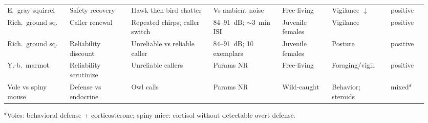 \begin{landscape}
\begin{longtable}{@{}p{0.95in}p{0.8in}p{1.25in}p{1.15in}p{0.85in}p{0.85in}p{0.55in}p{0.7in}@{}}
E.\ gray squirrel & Safety recovery & Hawk then bird chatter & Vs ambient noise & Free-living & Vigilance $\downarrow$ & positive & \citet{LillyEtAl2019} \\ \addlinespace[2pt]
Rich.\ ground sq.\ & Caller renewal & Repeated chirps; caller switch & 84--91~dB; $\sim$3~min ISI & Juvenile females & Vigilance & positive & \citet{Hare1998} \\ \addlinespace[2pt]
Rich.\ ground sq.\ & Reliability discount & Unreliable vs reliable caller & 84--91~dB; 10 exemplars & Juvenile females & Posture & positive & \citet{HareAtkins2001} \\ \addlinespace[2pt]
Y.-b.\ marmot & Reliability scrutinize & Unreliable callers & Params NR & Free-living & Foraging/vigil.\ & positive & \citet{BlumsteinEtAl2004} \\ \addlinespace[2pt]
Vole vs spiny mouse & Defense vs endocrine & Owl calls & Params NR & Wild-caught & Behavior; steroids & mixed$^{d}$ & \citet{EilamEtAl1999} \\
\end{longtable}
\endgroup
{\footnotesize $^{d}$Voles: behavioral defense + corticosterone; spiny mice: cortisol without detectable overt defense.}
\end{landscape}

